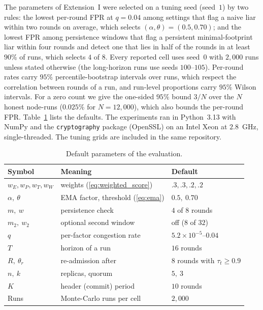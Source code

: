 \documentclass[lineno,pdflatex,sn-nature]{sn-jnl}
\theoremstyle{thmstyleone}%
\theoremstyle{thmstylethree}%
\begin{document}
The parameters of Extension~I were selected on a tuning seed (seed~$1$)
by two rules: the lowest per-round FPR at $q=0.04$ among settings that
flag a naive liar within two rounds on average, which selects
$(\alpha,\theta)=(0.5,0.70)$; and the lowest FPR among persistence
windows that flag a persistent minimal-footprint liar within four
rounds and detect one that lies in half of the rounds in at least
$90\%$ of runs, which selects $4$ of $8$.  Every reported cell uses
seed~$0$ with $2{,}000$ runs unless stated otherwise (the long-horizon
runs use seeds $100$--$105$).  Per-round rates carry $95\%$
percentile-bootstrap intervals over runs, which respect the correlation
between rounds of a run, and run-level proportions carry $95\%$ Wilson
intervals.  For a zero count we give the one-sided $95\%$ bound $3/N$
over the $N$ honest node-runs ($0.025\%$ for $N=12{,}000$), which also
bounds the per-round FPR.  Table~\ref{tab:params} lists the defaults.
The experiments ran in Python~3.13 with NumPy and the
\texttt{cryptography} package (OpenSSL) on an Intel Xeon at $2.8$~GHz,
single-threaded.  The tuning grids are included in the same repository.

\begin{table}[!t]
\caption{Default parameters of the evaluation.}
\label{tab:params}
\centering
\renewcommand{\arraystretch}{1.1}
\footnotesize
\setlength{\tabcolsep}{3pt}
\begin{tabular}{lll}
\toprule
{Symbol} & {Meaning} & {Default} \\
\midrule
$w_E,w_P,w_T,w_W$ & weights (\ref{eq:weighted_score}) & $.3,.3,.2,.2$ \\
$\alpha,\ \theta$ & EMA factor, threshold (\ref{eq:ema}) & $0.5,\ 0.70$ \\
$m,\ w$ & persistence check & $4$ of $8$ rounds \\
$m_2,\ w_2$ & optional second window & off ($8$ of $32$) \\
$q$ & per-factor congestion rate & $5.2\times10^{-5}$--$0.04$ \\
$T$ & horizon of a run & $16$ rounds \\
$R,\ \theta_r$ & re-admission after & $8$ rounds with $\tau_t\ge0.9$ \\
$n,\ k$ & replicas, quorum & $5,\ 3$ \\
$K$ & header (commit) period & $10$ rounds \\
Runs & Monte-Carlo runs per cell & $2{,}000$ \\
\bottomrule
\end{tabular}
\end{table}
\end{document}
